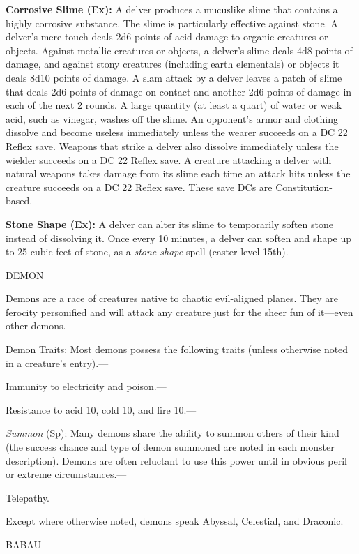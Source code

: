 \documentclass{article}
\begin{document}
\textbf{Corrosive Slime (Ex): }A delver produces a mucuslike slime that contains 
a highly corrosive substance. The slime is particularly effective against stone. 
A delver's mere touch deals 2d6 points of acid damage to organic creatures or objects. 
Against metallic creatures or objects, a delver's slime deals 4d8 points of damage, 
and against stony creatures (including earth elementals) or objects it deals 8d10 
points of damage. A slam attack by a delver leaves a patch of slime that deals 
2d6 points of damage on contact and another 2d6 points of damage in each of the 
next 2 rounds. A large quantity (at least a quart) of water or weak acid, such 
as vinegar, washes off the slime. An opponent's armor and clothing dissolve and 
become useless immediately unless the wearer succeeds on a DC 22 Reflex save. Weapons 
that strike a delver also dissolve immediately unless the wielder succeeds on a 
DC 22 Reflex save. A creature attacking a delver with natural weapons takes damage 
from its slime each time an attack hits unless the creature succeeds on a DC 22 
Reflex save. These save DCs are Constitution-based.

\textbf{Stone Shape (Ex):} A delver can alter its slime to temporarily soften stone 
instead of dissolving it. Once every 10 minutes, a delver can soften and shape 
up to 25 cubic feet of stone, as a \textit{stone shape }spell (caster level 15th).

\vspace{12pt}
{\LARGE{}DEMON}

Demons are a race of creatures native to chaotic evil-aligned planes. They are 
ferocity personified and will attack any creature just for the sheer fun of it---even 
other demons.

Demon Traits: Most demons possess the following traits (unless otherwise noted 
in a creature's entry).---

Immunity to electricity and poison.---

Resistance to acid 10, cold 10, and fire 10.---

\textit{Summon }(Sp): Many demons share the ability to summon others of their kind 
(the success chance and type of demon summoned are noted in each monster description). 
Demons are often reluctant to use this power until in obvious peril or extreme 
circumstances.---

Telepathy.

Except where otherwise noted, demons speak Abyssal, Celestial, and Draconic.

\vspace{12pt}
BABAU
\end{document}
